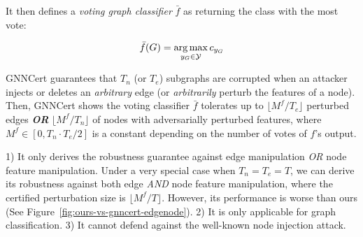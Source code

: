 It then defines a \emph{voting graph classifier} $\bar{f}$ as returning the class with the most vote:  


{
\vspace{-4mm}
\begin{align}
\bar{f}(G) = \underset{y_G \in \mathcal{Y}}{\arg\max} %
\,  c_{y_G} \label{eqn:vc_GC} 
\vspace{-2mm}
\end{align}
}%

GNNCert guarantees that $T_n$ (or $T_e$) subgraphs are corrupted when an attacker injects or deletes an \emph{arbitrary} edge (or \emph{arbitrarily} perturb the features of a node). Then, GNNCert shows the voting classifier $\bar{f}$ tolerates up to $\lfloor M^f/T_e \rfloor$ perturbed edges {\bf \emph{OR}} $\lfloor M^f/T_n \rfloor$ of nodes with adversarially perturbed features, where $M^f \in [0,T_n\cdot T_e/2]$ is a constant depending on the number of votes of $f$'s output. 


\vspace{+0.05in}
 1) It only derives the robustness guarantee against edge manipulation \emph{OR} node feature manipulation. 
{Under a very special case when $T_n = T_e = T$, we can derive its robustness against both edge \emph{AND} node feature manipulation, where the certified perturbation size is $\lfloor M^f/T \rfloor$.} However, its performance is worse than ours (See Figure~\ref{fig:ours-vs-gnncert-edgenode}). 
2) It is only applicable for graph classification. 3) It cannot defend against the well-known node injection attack. 

